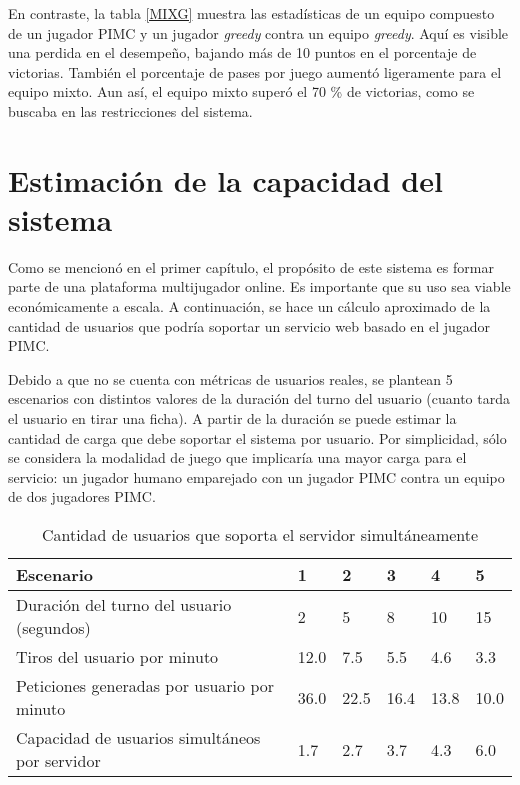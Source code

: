 En contraste, la tabla \ref{MIXG} muestra las estadísticas de un equipo
compuesto de un jugador PIMC y un jugador \textit{greedy} contra un equipo
\textit{greedy}. Aquí es visible una perdida en el desempeño, bajando más de 10
puntos en el porcentaje de victorias. También el porcentaje de pases por juego
aumentó ligeramente para el equipo mixto. Aun así, el equipo mixto superó el 70
\% de victorias, como se buscaba en las restricciones del sistema.

\section{Estimación de la capacidad del sistema}
\label{sec:capacity_estimation}

Como se mencionó en el primer capítulo, el propósito de este sistema es formar
parte de una plataforma multijugador online. Es importante que su uso sea viable
económicamente a escala. A continuación, se hace un cálculo aproximado de la
cantidad de usuarios que podría soportar un servicio web basado en el jugador
PIMC.

Debido a que no se cuenta con métricas de usuarios reales, se plantean 5
escenarios con distintos valores de la duración del turno del usuario (cuanto
tarda el usuario en tirar una ficha). A partir de la duración se puede estimar
la cantidad de carga que debe soportar el sistema por usuario. Por simplicidad,
sólo se considera la modalidad de juego que implicaría una mayor carga para el
servicio: un jugador humano emparejado con un jugador PIMC contra un equipo de
dos jugadores PIMC.

\begin{table}[!ht]
    \centering
    \caption{
        Cantidad de usuarios que soporta el servidor simultáneamente
    }
    \small
    \begin{tabular}{|l|l|l|l|l|l|}
        \hline
        Escenario                                      & 1    & 2    & 3    & 4    & 5    \\ \hline
        Duración del turno del usuario (segundos)      & 2    & 5    & 8    & 10   & 15   \\ \hline
        Tiros del usuario por minuto                   & 12.0 & 7.5  & 5.5  & 4.6  & 3.3  \\ \hline
        Peticiones generadas por usuario por minuto    & 36.0 & 22.5 & 16.4 & 13.8 & 10.0 \\ \hline
        Capacidad de usuarios simultáneos por servidor & 1.7  & 2.7  & 3.7  & 4.3  & 6.0  \\ \hline
    \end{tabular}
    \label{CPC}
\end{table}

